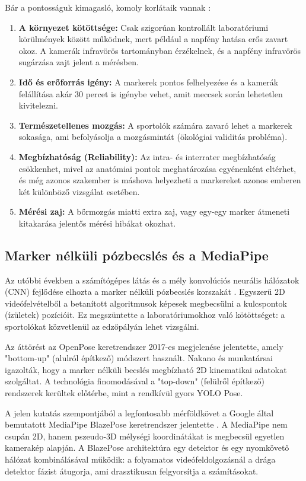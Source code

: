 Bár a pontosságuk kimagasló, komoly korlátaik vannak \cite{Verhoeven2021}:
\begin{enumerate}
    \item \textbf{A környezet kötöttsége:} Csak szigorúan kontrollált laboratóriumi körülmények között működnek, mert például a napfény hatása erős zavart okoz. A kamerák infravörös tartományban érzékelnek, és a napfény infravörös sugárzása zajt jelent a mérésben.
    \item \textbf{Idő és erőforrás igény:} A markerek pontos felhelyezése és a kamerák felállítása akár 30 percet is igénybe vehet, amit meccsek során lehetetlen kivitelezni.
    \item \textbf{Természetellenes mozgás:} A sportolók számára zavaró lehet a markerek sokasága, ami befolyásolja a mozgásmintát (ökológiai validitás probléma).
    \item \textbf{Megbízhatóság (Reliability):} Az intra- és interrater megbízhatóság csökkenhet, mivel az anatómiai pontok meghatározása egyénenként eltérhet, és még azonos szakember is máshova helyezheti a markereket azonos emberen két különböző vizsgálat esetében.
    \item \textbf{Mérési zaj:} A bőrmozgás miatti extra zaj, vagy egy-egy marker átmeneti kitakarása jelentős mérési hibákat okozhat.
\end{enumerate}

\subsection{Marker nélküli pózbecslés és a MediaPipe}
Az utóbbi években a számítógépes látás és a mély konvolúciós neurális hálózatok (CNN) fejlődése elhozta a marker nélküli pózbecslés korszakát \cite{Chen2021, Otsuka2026, Mundt2023, Prazak2024}. Egyszerű 2D videófelvételből a betanított algoritmusok képesek megbecsülni a kulcspontok (ízületek) pozícióit. Ez megszüntette a laboratóriumokhoz való kötöttséget: a sportolókat közvetlenül az edzőpályán lehet vizsgálni.

Az áttörést az OpenPose \cite{Cao2017} keretrendszer 2017-es megjelenése jelentette, amely "bottom-up" (alulról építkező) módszert használt. Nakano és munkatársai \cite{Nakano2020} igazolták, hogy a marker nélküli becslés megbízható 2D kinematikai adatokat szolgáltat. A technológia finomodásával a "top-down" (felülről építkező) rendszerek kerültek előtérbe, mint a rendkívül gyors YOLO Pose.

A jelen kutatás szempontjából a legfontosabb mérföldkövet a Google által bemutatott MediaPipe BlazePose keretrendszer jelentette \cite{Lugaresi2019}. A MediaPipe nem csupán 2D, hanem pszeudo-3D mélységi koordinátákat is megbecsül egyetlen kamerakép alapján. A BlazePose architektúra egy detektor és egy nyomkövető hálózat kombinálásával működik: a folyamatos videófeldolgozásnál a drága detektor fázist átugorja, ami drasztikusan felgyorsítja a számításokat.

